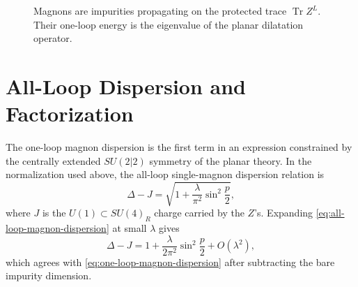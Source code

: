 \begin{figure}[H]
  \centering
  \caption{Magnons are impurities propagating on the protected trace
  \(\operatorname{Tr}Z^L\).  Their one-loop energy is the eigenvalue of the
  planar dilatation operator.}
  \label{fig:magnon-dispersion-chain}
\end{figure}

\section{All-Loop Dispersion and Factorization}

The one-loop magnon dispersion is the first term in an expression constrained
by the centrally extended \(SU(2|2)\) symmetry of the planar theory.  In the
normalization used above, the all-loop single-magnon dispersion relation is
\begin{equation}
  \Delta-J
  =
  \sqrt{
    1+\frac{\lambda}{\pi^2}\sin^2\frac p2
  },
  \label{eq:all-loop-magnon-dispersion}
\end{equation}
where \(J\) is the \(U(1)\subset SU(4)_R\) charge carried by the \(Z\)'s.
Expanding \eqref{eq:all-loop-magnon-dispersion} at small \(\lambda\) gives
\[
  \Delta-J
  =
  1+\frac{\lambda}{2\pi^2}\sin^2\frac p2
  +O(\lambda^2),
\]
which agrees with \eqref{eq:one-loop-magnon-dispersion} after subtracting the
bare impurity dimension.

